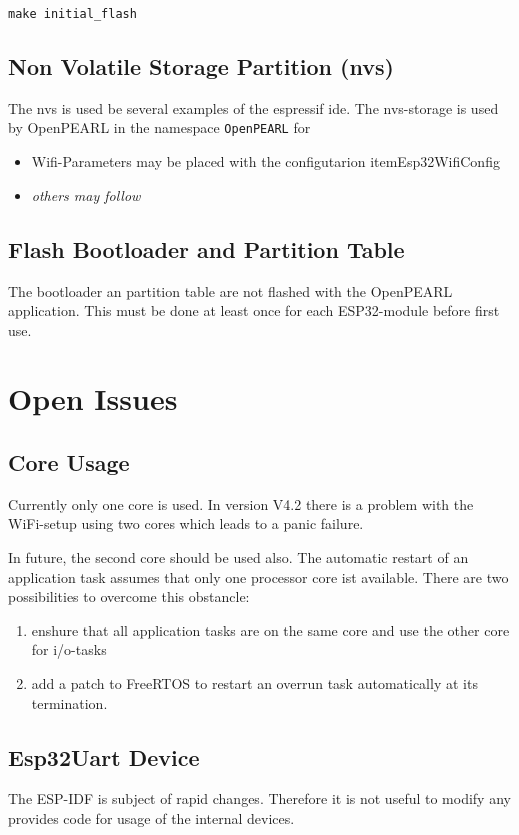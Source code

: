 \begin{verbatim}
make initial_flash
\end{verbatim}

\subsection{Non Volatile Storage Partition (nvs)}
The nvs is used be several examples of the espressif ide. 
The nvs-storage is used by OpenPEARL in the namespace \texttt{OpenPEARL} for
\begin{itemize}
\item Wifi-Parameters may be placed with the configutarion itemEsp32WifiConfig
\item \textit{others may follow}
\end{itemize}


\subsection{Flash Bootloader and Partition Table}
The bootloader an partition table are not flashed with the OpenPEARL application.
This must be done at least once for each ESP32-module before first use.


\section{Open Issues}
\subsection{Core Usage}
Currently only one core is used.
In version V4.2 there is a problem with the WiFi-setup using two cores which leads to a panic failure.

In future, the second core should be used also.
The automatic restart of an application task assumes that only one processor core ist 
available.
There are two possibilities to overcome this obstancle:
\begin{enumerate}
\item enshure that all application tasks are on the same core and use the other core for i/o-tasks
\item add a patch to FreeRTOS to restart an overrun task automatically at its termination.
\end{enumerate}

\subsection{Esp32Uart Device}
The ESP-IDF is subject of rapid changes. Therefore it is not 
useful to modify any provides code for usage of the internal devices.

